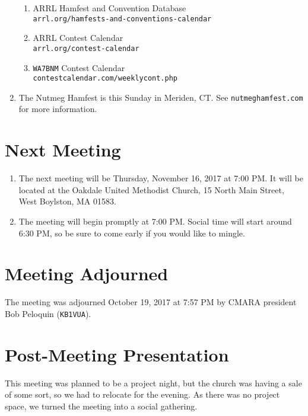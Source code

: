 \documentclass[10pt,letterpaper]{article}
\begin{document}
\begin{enumerate}
  \begin{enumerate}
    \item ARRL Hamfest and Convention Database\\
          \texttt{arrl.org/hamfests-and-conventions-calendar}
    \item ARRL Contest Calendar\\
          \texttt{arrl.org/contest-calendar}
    \item \texttt{WA7BNM} Contest Calendar\\
          \texttt{contestcalendar.com/weeklycont.php}
  \end{enumerate}
  \item The Nutmeg Hamfest is this Sunday in Meriden, CT. See \texttt{nutmeghamfest.com} for more information.
\end{enumerate}

\section{Next Meeting}
\begin{enumerate}
  \item The next meeting will be Thursday, November 16, 2017 at 7:00 PM. It will be located at the Oakdale United Methodist Church, 15 North Main Street, West Boylston, MA 01583.
  \item The meeting will begin promptly at 7:00 PM. Social time will start around 6:30 PM, so be sure to come early if you would like to mingle.
\end{enumerate}

\section{Meeting Adjourned}
The meeting was adjourned October 19, 2017 at 7:57 PM by CMARA president Bob Peloquin (\texttt{KB1VUA}).

\section{Post-Meeting Presentation}
This meeting was planned to be a project night, but the church was having a sale of some sort, so we had to relocate for the evening. As there was no project space, we turned the meeting into a social gathering.
\end{document}
